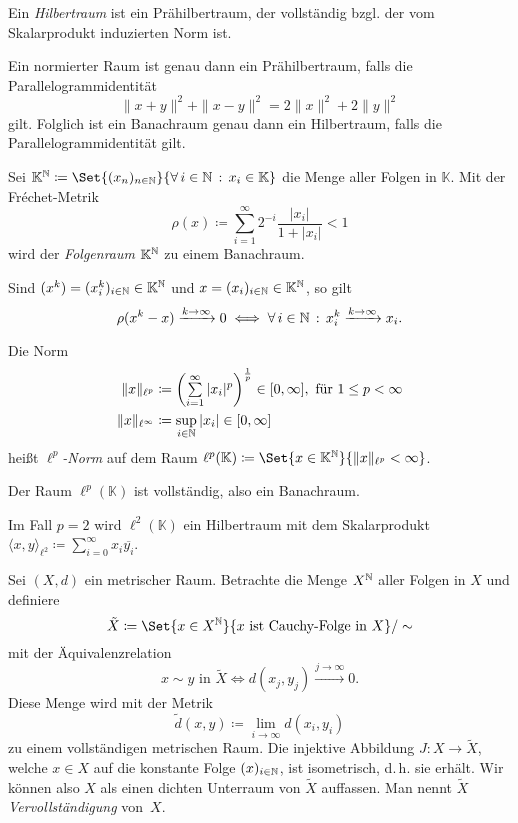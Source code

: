 \documentclass{cheat-sheet}
\newcommand{\K}{\mathbb{K}}
\newcommand{\convWith}[1]{\xrightarrow{#1 \to \infty}} %
\begin{document}
\begin{defn}
  Ein \emph{Hilbertraum} ist ein Prähilbertraum, der vollständig bzgl. der vom Skalarprodukt induzierten Norm ist.
\end{defn}

\begin{bem}
  Ein normierter Raum ist genau dann ein Prähilbertraum, falls die Parallelogrammidentität
  \[ \|x+y\|^2 + \|x-y\|^2 = 2 \|x\|^2 + 2 \|y\|^2 \]
  gilt. Folglich ist ein Banachraum genau dann ein Hilbertraum, falls die Parallelogrammidentität gilt.
\end{bem}

\begin{defn}
  Sei $\K^\N \coloneqq \Set{ (x_n)_{n \in \N} }{ \fa{i \in \N} x_i \in \K }$ die Menge aller Folgen in $\K$. Mit der Fréchet-Metrik
    \[ \rho(x) \coloneqq \sum_{i = 1}^\infty 2^{-i} \frac{ |x_i| }{ 1 + |x_i| } < 1 \]
  wird der \emph{Folgenraum} $\K^\N$ zu einem Banachraum.
\end{defn}

\begin{satz}
  Sind $(x^k) = (x^k_i)_{i \in \N} \in \K^\N$ und $x = (x_i)_{i \in \N} \in \K^\N$, so gilt
  \[ \rho(x^k - x) \convWith{k} 0 \iff \fa{i \in \N} x_i^k \convWith{k} x_i. \]
\end{satz}

\begin{defn}
  Die Norm
  \begin{align*}
    \| x \|_{\ell^p} &\coloneqq \left( \sum_{i=1}^\infty |x_i|^p \right)^{\frac{1}{p}} \in [0, \infty], \text{ für } 1 \leq p < \infty \\
    \| x \|_{\ell^\infty} &\coloneqq \sup_{i \in \N} |x_i| \in [0, \infty]
  \end{align*}
  heißt \emph{$\ell^p$-Norm} auf dem Raum $\ell^p(\K) \coloneqq \Set{ x \in \K^\N }{ \| x \|_{\ell^p} < \infty }$.
\end{defn}

\begin{satz}
  Der Raum $\ell^p(\K)$ ist vollständig, also ein Banachraum.
\end{satz}

\begin{bem}
  Im Fall $p = 2$ wird $\ell^2(\K)$ ein Hilbertraum mit dem Skalarprodukt $\langle x , y \rangle_{\ell^2} \coloneqq \sum_{i = 0}^\infty x_i \overline{y_i}$.
\end{bem}

\begin{defn}[Vervollständigung]
  Sei $(X, d)$ ein metrischer Raum. Betrachte die Menge $X^{\mathbb{N}}$ aller Folgen in $X$ und definiere
  \[ \tilde{X} \coloneqq \Set{ x \in X^\N }{ x \text{ ist Cauchy-Folge in } X }/\sim \]
  mit der Äquivalenzrelation
  \[ x \sim y \text{ in } \tilde{X} \iff d(x_j, y_j) \convWith{j} 0. \]
  Diese Menge wird mit der Metrik
  \[ \tilde{d}(x, y) \coloneqq \lim_{i \to \infty} d(x_i, y_i) \]
  zu einem vollständigen metrischen Raum. Die injektive Abbildung $J : X \to \tilde{X}$, welche $x \in X$ auf die konstante Folge $(x)_{i \in \mathbb{N}}$, ist isometrisch, d.\,h. sie erhält. Wir können also $X$ als einen dichten Unterraum von $\tilde{X}$ auffassen. Man nennt $\tilde{X}$ \emph{Vervollständigung} von~$X$.
\end{defn}
\end{document}
